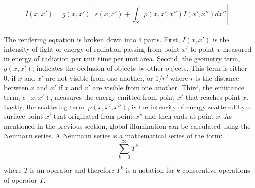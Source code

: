 \begin{equation}
I(x,x') = g(x,x')[\epsilon(x,x')+\int_{S} \rho(x,x',x'')I(x',x'')dx''] \label{eqn:render}
\end{equation}

\paragraph{}
The rendering equation is broken down into 4 parts.  First, $I(x,x')$ is the intensity of light or energy of radiation passing from point $x'$ to point $x$ measured in energy of radiation per unit time per unit area.  Second, the geometry term, $g(x,x')$, indicates the occlusion of objects by other objects.  This term is either $0$, if $x$ and $x'$ are not visible from one another, or $1/r^2$ where $r$ is the distance between $x$ and $x'$ if $x$ and $x'$ are visible from one another.  Third, the emittance term, $\epsilon(x,x')$, measures the energy emitted from point $x'$ that reaches point $x$.  Lastly, the scattering term, $\rho(x,x',x'')$, is the intensity of energy scattered by a surface point $x'$ that originated from point $x''$ and then ends at point $x$.  As mentioned in the previous section, global illumination can be calculated using the Neumann series.  A Neumann series is a mathematical series of the form:
\begin{equation}
\sum_{k=0}^{\infty}T^k \label{eqn:neumann}
\end{equation}

where $T$ is an operator and therefore $T^k$ is a notation for $k$ consecutive operations of operator $T$. 


